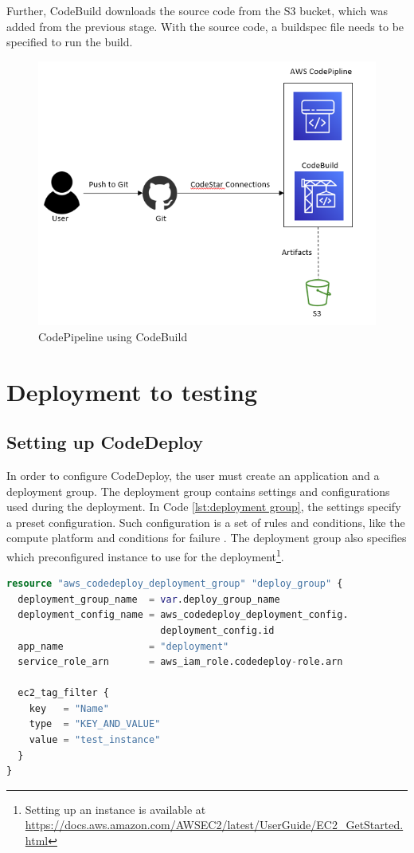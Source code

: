 Further, CodeBuild downloads the source code from the S3 bucket, which was added from the previous stage. With the source code, a \gls{buildspec} file needs to be specified to run the build.

\vspace{2mm}
\begin{figure}[H]
    \centering
    \includegraphics[width=0.6\columnwidth]{Images/aws-piplin-3.png}
    \caption{CodePipeline using CodeBuild}
    \label{fig: CodePipeline using CodeBuild}
\end{figure}

\section{Deployment to testing}
\label{Deployment to testing}
\subsection{Setting up CodeDeploy}
In order to configure CodeDeploy, the user must create an application and a deployment group. The deployment group contains settings and configurations used during the deployment. In Code \ref{lst:deployment group}, the settings specify a preset configuration. Such configuration is a set of rules and conditions, like the compute platform and conditions for failure \cite{CodeDeployConfig}. The deployment group also specifies which preconfigured instance to use for the deployment\footnote{Setting up an instance is available at \url{https://docs.aws.amazon.com/AWSEC2/latest/UserGuide/EC2_GetStarted.html}}. 

\vspace{2mm}
\begin{lstlisting}[language=terraform, caption=Creation of the deployment group, captionpos=b, frame=single, label= {lst:deployment group}]
resource "aws_codedeploy_deployment_group" "deploy_group" {
  deployment_group_name  = var.deploy_group_name
  deployment_config_name = aws_codedeploy_deployment_config.
                           deployment_config.id
  app_name               = "deployment"
  service_role_arn       = aws_iam_role.codedeploy-role.arn

  ec2_tag_filter {
    key   = "Name"
    type  = "KEY_AND_VALUE"
    value = "test_instance"
  }
}
\end{lstlisting}


